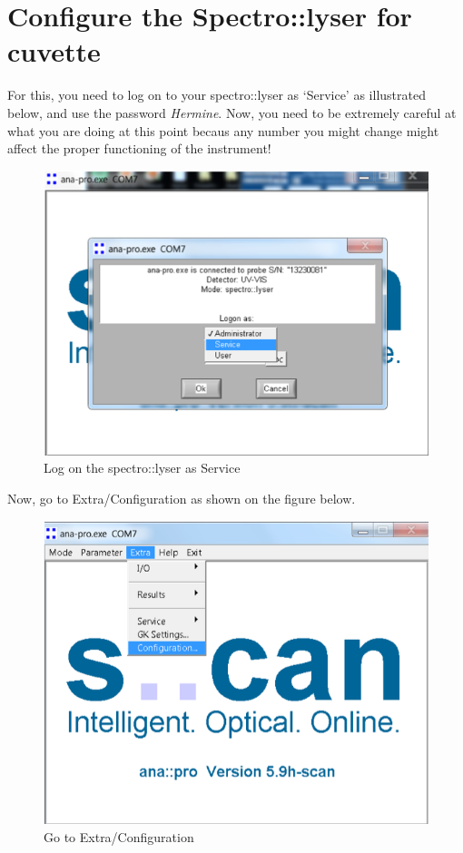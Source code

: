 \documentclass[]{book}
\begin{document}
\hypertarget{configure-the-spectrolyser-for-cuvette}{%
\section{Configure the Spectro::lyser for cuvette}\label{configure-the-spectrolyser-for-cuvette}}

For this, you need to log on to your spectro::lyser as `Service' as illustrated below, and use the password \emph{Hermine}. Now, you need to be extremely careful at what you are doing at this point becaus any number you might change might affect the proper functioning of the instrument!

\begin{figure}

{\centering \includegraphics[width=0.7\linewidth]{pictures/SCAN-config-hermine} 

}

\caption{Log on the spectro::lyser as Service}\label{fig:SCAN-config-hermine}
\end{figure}

Now, go to Extra/Configuration as shown on the figure below.

\begin{figure}

{\centering \includegraphics[width=0.7\linewidth]{pictures/SCAN-config-extra} 

}

\caption{Go to Extra/Configuration}\label{fig:SCAN-config-extra}
\end{figure}
\end{document}
